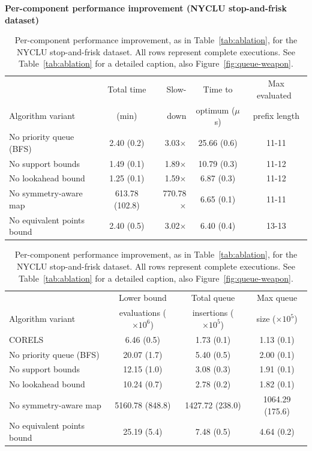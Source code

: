 \begin{table}[t!]
\begin{centering}
\textbf{Per-component performance improvement (NYCLU stop-and-frisk dataset)} \\
\end{centering}
\vspace{1mm}
\begin{tabular}{l | c  r | c | c}
& Total time & Slow- & Time to & Max evaluated~ \\
Algorithm variant & (min) & down & optimum ($\mu$s) & prefix length \\
\hline
No priority queue (BFS) & 2.40 (0.2) & 3.03$\times$ & 25.66 (0.6) & 11-11 \\
No support bounds & 1.49 (0.1) & 1.89$\times$ & 10.79 (0.3) & 11-12 \\
No lookahead bound & 1.25 (0.1) & 1.59$\times$ & 6.87 (0.3) & 11-12 \\
No symmetry-aware map & 613.78 (102.8) & 770.78$\times$ & 6.65 (0.1) & 11-11 \\
No equivalent points bound & 2.40 (0.5) & 3.02$\times$ & 6.40 (0.4) & 13-13 \\
\hline
\end{tabular}
\begin{tabular}{l | c | c | c}
\hline
 & Lower bound & Total queue &  Max queue \\
Algorithm variant & evaluations ($\times 10^6$) & insertions ($\times 10^5$) & size ($\times 10^5$) \\
\hline
CORELS & 6.46 (0.5) & 1.73 (0.1) & 1.13 (0.1) \\
No priority queue (BFS) & 20.07 (1.7) & 5.40 (0.5) & 2.00 (0.1) \\
No support bounds & 12.15 (1.0) & 3.08 (0.3) & 1.91 (0.1) \\
No lookahead bound & 10.24 (0.7) & 2.78 (0.2) & 1.82 (0.1) \\
No symmetry-aware map & 5160.78 (848.8) & 1427.72 (238.0) & 1064.29 (175.6) \\
No equivalent points bound & 25.19 (5.4) & 7.48 (0.5) & 4.64 (0.2) \\
\end{tabular}
\caption{Per-component performance improvement, as in Table~\ref{tab:ablation},
for the NYCLU stop-and-frisk dataset.
%
All rows represent complete executions.
%
See Table~\ref{tab:ablation} for a detailed caption,
also Figure~\ref{fig:queue-weapon}.
}
\vspace{4mm}
\label{tab:ablation-weapon}
\end{table}

